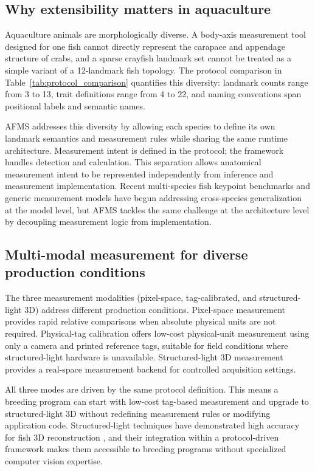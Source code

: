 \documentclass[final,3p,times]{elsarticle}
\begin{document}
\subsection{Why extensibility matters in aquaculture}

Aquaculture animals are morphologically diverse. A body-axis measurement tool designed for one fish cannot directly represent the carapace and appendage structure of crabs, and a sparse crayfish landmark set cannot be treated as a simple variant of a 12-landmark fish topology. The protocol comparison in Table~\ref{tab:protocol_comparison} quantifies this diversity: landmark counts range from 3 to 13, trait definitions range from 4 to 22, and naming conventions span positional labels and semantic names.

AFMS addresses this diversity by allowing each species to define its own landmark semantics and measurement rules while sharing the same runtime architecture. Measurement intent is defined in the protocol; the framework handles detection and calculation. This separation allows anatomical measurement intent to be represented independently from inference and measurement implementation. Recent multi-species fish keypoint benchmarks \citep{liu2024fishphenokey} and generic measurement models \citep{he2024measurement} have begun addressing cross-species generalization at the model level, but AFMS tackles the same challenge at the architecture level by decoupling measurement logic from implementation.

\subsection{Multi-modal measurement for diverse production conditions}

The three measurement modalities (pixel-space, tag-calibrated, and structured-light 3D) address different production conditions. Pixel-space measurement provides rapid relative comparisons when absolute physical units are not required. Physical-tag calibration offers low-cost physical-unit measurement using only a camera and printed reference tags, suitable for field conditions where structured-light hardware is unavailable. Structured-light 3D measurement provides a real-space measurement backend for controlled acquisition settings.

All three modes are driven by the same protocol definition. This means a breeding program can start with low-cost tag-based measurement and upgrade to structured-light 3D without redefining measurement rules or modifying application code. Structured-light techniques have demonstrated high accuracy for fish 3D reconstruction \citep{veinidis2023reconstruction}, and their integration within a protocol-driven framework makes them accessible to breeding programs without specialized computer vision expertise.
\end{document}

